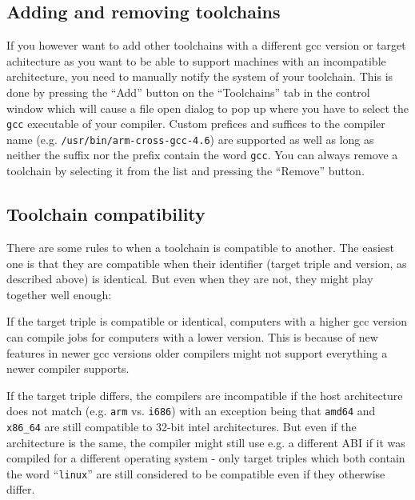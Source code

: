 \documentclass[a4paper,9pt]{scrartcl}
\begin{document}
\subsection{Adding and removing toolchains}

If you however want to add other toolchains with a different gcc version or target achitecture as you want to be able to support machines with an incompatible architecture, you need to manually notify the system of your toolchain. This is done by pressing the ``Add'' button on the ``Toolchains'' tab in the control window which will cause a file open dialog to pop up where you have to select the \texttt{gcc} executable of your compiler. Custom prefices and suffices to the compiler name (e.g. \texttt{/usr/bin/arm-cross-gcc-4.6}) are supported as well as long as neither the suffix nor the prefix contain the word \texttt{gcc}. You can always remove a toolchain by selecting it from the list and pressing the ``Remove'' button.

\subsection{Toolchain compatibility}

There are some rules to when a toolchain is compatible to another. The easiest one is that they are compatible when their identifier (target triple and version, as described above) is identical. But even when they are not, they might play together well enough:

If the target triple is compatible or identical, computers with a higher gcc version can compile jobs for computers with a lower version. This is because of new features in newer gcc versions older compilers might not support everything a newer compiler supports.

If the target triple differs, the compilers are incompatible if the host architecture does not match (e.g. \texttt{arm} vs. \texttt{i686}) with an exception being that \texttt{amd64} and \texttt{x86\_64} are still compatible to 32-bit intel architectures. But even if the architecture is the same, the compiler might still use e.g. a different ABI if it was compiled for a different operating system - only target triples which both contain the word ``\texttt{linux}'' are still considered to be compatible even if they otherwise differ.
\end{document}
